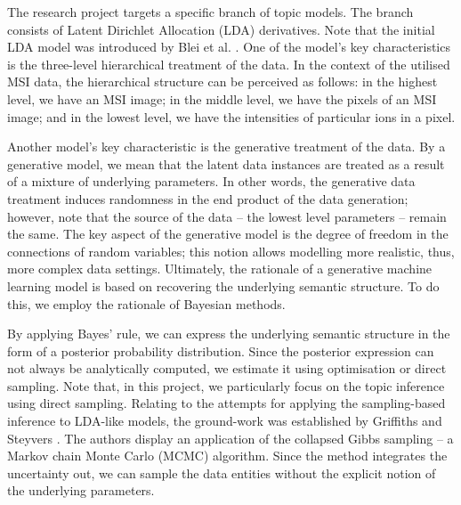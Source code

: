 \documentclass{mpaper}
\begin{document}
\par The research project targets a specific branch of topic models. The branch consists of Latent Dirichlet Allocation (LDA) derivatives. Note that the initial LDA model was introduced by Blei et al. \cite{blei2003latent}. One of the model's key characteristics is the three-level hierarchical treatment of the data. In the context of the utilised MSI data, the hierarchical structure can be perceived as follows: in the highest level, we have an MSI image; in the middle level, we have the pixels of an MSI image; and in the lowest level, we have the intensities of particular ions in a pixel.

\par Another model's key characteristic is the generative treatment of the data. By a generative model, we mean that the latent data instances are treated as a result of a mixture of underlying parameters. In other words, the generative data treatment induces randomness in the end product of the data generation; however, note that the source of the data -- the lowest level parameters -- remain the same. The key aspect of the generative model is the degree of freedom in the connections of random variables; this notion allows modelling more realistic, thus, more complex data settings. Ultimately, the rationale of a generative machine learning model is based on recovering the underlying semantic structure. To do this, we employ the rationale of Bayesian methods.

\par By applying Bayes' rule, we can express the underlying semantic structure in the form of a posterior probability distribution. Since the posterior expression can not always be analytically computed, we estimate it using optimisation or direct sampling. Note that, in this project, we particularly focus on the topic inference using direct sampling. Relating to the attempts for applying the sampling-based inference to LDA-like models, the ground-work was established by Griffiths and Steyvers \cite{griffiths2004finding}. The authors display an application of the collapsed Gibbs sampling -- a Markov chain Monte Carlo (MCMC) algorithm. Since the method integrates the uncertainty out, we can sample the data entities without the explicit notion of the underlying parameters.
\end{document}
